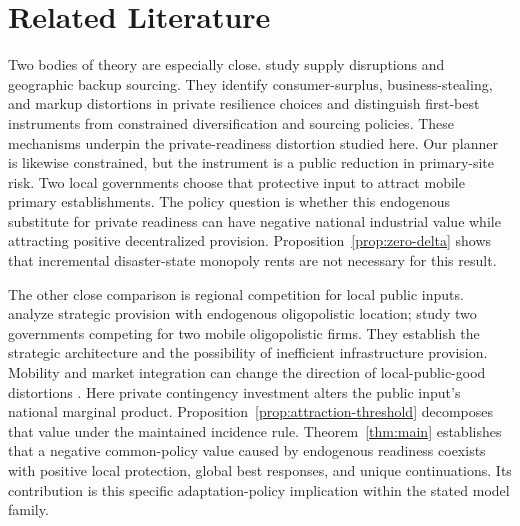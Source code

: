 \section{Related Literature}\label{sec:literature}

Two bodies of theory are especially close. \citet{GrossmanHelpmanLhuillier2023} study supply disruptions and geographic backup sourcing. They identify consumer-surplus, business-stealing, and markup distortions in private resilience choices and distinguish first-best instruments from constrained diversification and sourcing policies. These mechanisms underpin the private-readiness distortion studied here. Our planner is likewise constrained, but the instrument is a public reduction in primary-site risk. Two local governments choose that protective input to attract mobile primary establishments. The policy question is whether this endogenous substitute for private readiness can have negative national industrial value while attracting positive decentralized provision. Proposition~\ref{prop:zero-delta} shows that incremental disaster-state monopoly rents are not necessary for this result.

The other close comparison is regional competition for local public inputs. \citet{WalzWellisch1996} analyze strategic provision with endogenous oligopolistic location; \citet{MaurerWalz2000} study two governments competing for two mobile oligopolistic firms. They establish the strategic architecture and the possibility of inefficient infrastructure provision. Mobility and market integration can change the direction of local-public-good distortions \citep{Matsumoto1998,Ihara2008}. Here private contingency investment alters the public input's national marginal product. Proposition~\ref{prop:attraction-threshold} decomposes that value under the maintained incidence rule. Theorem~\ref{thm:main} establishes that a negative common-policy value caused by endogenous readiness coexists with positive local protection, global best responses, and unique continuations. Its contribution is this specific adaptation-policy implication within the stated model family.

